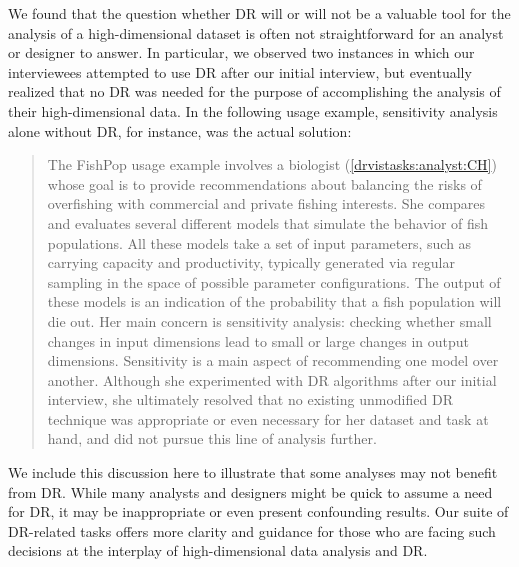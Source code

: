 We found that the question whether \ac{DR} will or will not be a valuable tool for the analysis of a high-dimensional dataset is often not straightforward for an analyst or designer to answer. 
In particular, we observed two instances in which our interviewees attempted to use \ac{DR} after our initial interview, but eventually realized that no \ac{DR} was needed for the purpose of accomplishing the analysis of their high-dimensional data. 
In the following usage example, sensitivity analysis alone without \ac{DR}, for instance, was the actual solution:

\begin{quotation}
    The {\sc FishPop} usage example involves a biologist (\ref{drvistasks:analyst:CH}) whose goal is to provide recommendations about balancing the risks of overfishing with commercial and private fishing interests.
    She compares and evaluates several different models that simulate the behavior of fish populations.
    All these models take a set of input parameters, such as carrying capacity and productivity, typically generated via regular sampling in the space of possible parameter configurations. 
    The output of these models is an indication of the probability that a fish population will die out.
    Her main concern is sensitivity analysis: checking whether small changes in input dimensions lead to small or large changes in output dimensions. 
    Sensitivity is a main aspect of recommending one model over another. 
    Although she experimented with \ac{DR} algorithms after our initial interview, she ultimately resolved that no existing unmodified \ac{DR} technique was appropriate or even necessary for her dataset and task at hand, and did not pursue this line of analysis further.
\end{quotation}

We include this discussion here to illustrate that some analyses may not benefit from \ac{DR}. 
While many analysts and designers might be quick to assume a need for \ac{DR}, it may be inappropriate or even present confounding results. 
Our suite of \ac{DR}-related tasks offers more clarity and guidance for those who are facing such decisions at the interplay of high-dimensional data analysis and \ac{DR}.

